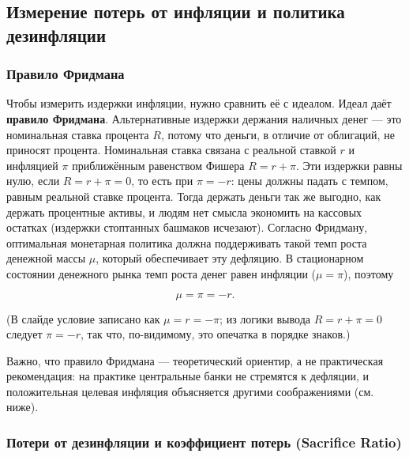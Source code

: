 \documentclass[11pt,a4paper]{article}
\begin{document}
\subsection{Измерение потерь от инфляции и политика дезинфляции}

\subsubsection{Правило Фридмана}

Чтобы измерить издержки инфляции, нужно сравнить её с идеалом. Идеал даёт \textbf{правило Фридмана}. Альтернативные издержки держания наличных денег --- это номинальная ставка процента $R$, потому что деньги, в отличие от облигаций, не приносят процента. Номинальная ставка связана с реальной ставкой $r$ и инфляцией $\pi$ приближённым равенством Фишера $R=r+\pi$. Эти издержки равны нулю, если $R=r+\pi=0$, то есть при $\pi=-r$: цены должны падать с темпом, равным реальной ставке процента. Тогда держать деньги так же выгодно, как держать процентные активы, и людям нет смысла экономить на кассовых остатках (издержки стоптанных башмаков исчезают). Согласно Фридману, оптимальная монетарная политика должна поддерживать такой темп роста денежной массы $\mu$, который обеспечивает эту дефляцию. В стационарном состоянии денежного рынка темп роста денег равен инфляции ($\mu=\pi$), поэтому
\begin{formulabox}
\begin{equation*}
\mu=\pi=-r.
\end{equation*}
\end{formulabox}
(В слайде условие записано как $\mu=r=-\pi$; из логики вывода $R=r+\pi=0$ следует $\pi=-r$, так что, по-видимому, это опечатка в порядке знаков.)

Важно, что правило Фридмана --- теоретический ориентир, а не практическая рекомендация: на практике центральные банки не стремятся к дефляции, и положительная целевая инфляция объясняется другими соображениями (см. ниже).

\subsubsection{Потери от дезинфляции и коэффициент потерь (Sacrifice Ratio)}
\end{document}

